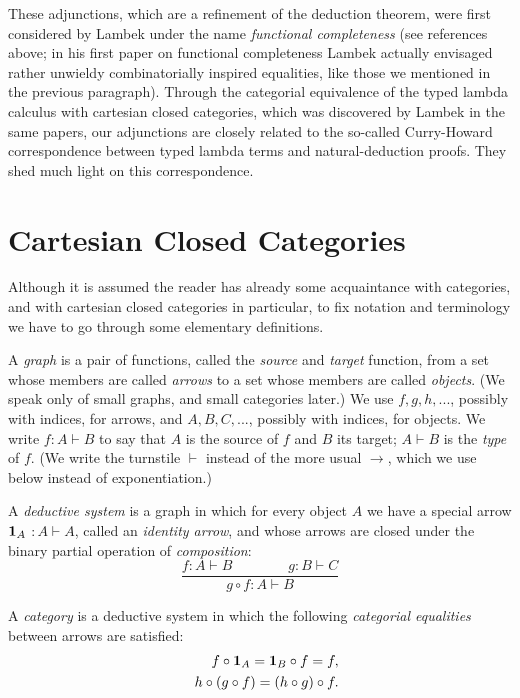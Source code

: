 \documentclass[12pt]{article}
\begin{document}
These adjunctions, which are a refinement of the deduction theorem, were
first considered by Lambek under the name {\it functional completeness} (see
references above; in his first paper on functional completeness \cite{Lam72}
Lambek actually envisaged rather unwieldy combinatorially inspired
equalities, like those we mentioned in the previous paragraph). Through the
categorial equivalence of the typed lambda calculus with cartesian closed
categories, which was discovered by Lambek in the same papers, our
adjunctions are closely related to the so-called Curry-Howard correspondence
between typed lambda terms and natural-deduction proofs. They shed much
light on this correspondence.

\section{Cartesian Closed Categories}

\noindent Although it is assumed the reader has already some acquaintance
with categories, and with cartesian closed categories in particular, to fix
notation and terminology we have to go through some elementary definitions.

A {\it graph} is a pair of functions, called the {\it source} and {\it target%
} function, from a set whose members are called {\it arrows} to a set whose
members are called {\it objects}. (We speak only of small graphs, and small
categories later.) We use $f,g,h,...$, possibly with indices, for arrows,
and $A,B,C,...$, possibly with indices, for objects. We write $f:A\vdash B$
to say that $A$ is the source of $f$ and $B$ its target; $A\vdash B$ is the 
{\it type} of $f$. (We write the turnstile $\vdash $ instead of the more
usual $\rightarrow $, which we use below instead of exponentiation.)

A {\it deductive system} is a graph in which for every object $A$ we have a
special arrow ${\bf 1}_{A}$ $:A\vdash A$, called an {\it identity arrow},
and whose arrows are closed under the binary partial operation of {\it %
composition}: 
\[
\frac{f:A\vdash B\qquad \qquad g:B\vdash C}{g\circ f:A\vdash B} 
\]

A {\it category} is a deductive system in which the following {\it %
categorial equalities} between arrows are satisfied: 
\begin{eqnarray*}
&&f\circ {\bf 1}_{A}={\bf 1}_{B}\circ f=f, \\
&&h\circ (g\circ f)=(h\circ g)\circ f.
\end{eqnarray*}
\end{document}
